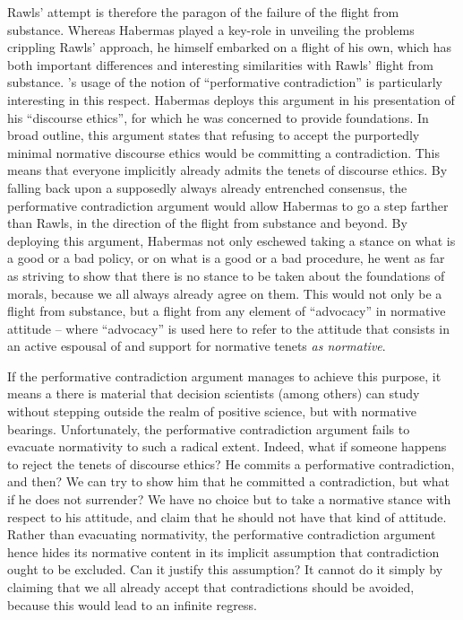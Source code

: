 \documentclass[preprint,11pt]{elsarticle}
\begin{document}
Rawls' attempt is therefore the paragon of the failure of the flight from substance. Whereas Habermas played a key-role in unveiling the problems crippling Rawls' approach, he himself embarked on a flight of his own, which has both important differences and interesting similarities with Rawls' flight from substance. \cite{habermas_moralbewustsein_1983}'s usage of the notion of ``performative contradiction'' is particularly interesting in this respect. Habermas deploys this argument in his presentation of his ``discourse ethics'', for which he was concerned to provide foundations. In broad outline, this argument states that refusing to accept the purportedly minimal normative discourse ethics would be committing a contradiction. This means that everyone implicitly already admits the tenets of discourse ethics. By falling back upon a supposedly always already entrenched consensus, the performative contradiction argument would allow Habermas to go a step farther than Rawls, in the direction of the flight from substance and beyond. By deploying this argument, Habermas not only eschewed taking a stance on what is a good or a bad policy, or on what is a good or a bad procedure, he went as far as striving to show that there is no stance to be taken about the foundations of morals, because we all always already agree on them. This would not only be a flight from substance, but a flight from any element of ``advocacy'' in normative attitude -- where ``advocacy'' is used here to refer to the attitude that consists in an active espousal of and support for normative tenets \emph{as normative}. 

If the performative contradiction argument manages to achieve this purpose, it means a there is material that decision scientists (among others) can study without stepping outside the realm of positive science, but with normative bearings. Unfortunately, the performative contradiction argument fails to evacuate normativity to such a radical extent. Indeed, what if someone happens to reject the tenets of discourse ethics? He commits a performative contradiction, and then? We can try to show him that he committed a contradiction, but what if he does not surrender? We have no choice but to take a normative stance with respect to his attitude, and claim that he should not have that kind of attitude. Rather than evacuating normativity, the performative contradiction argument hence hides its normative content in its implicit assumption that contradiction ought to be excluded. Can it justify this assumption? It cannot do it simply by claiming that we all already accept that contradictions should be avoided, because this would lead to an infinite regress.
\end{document}
